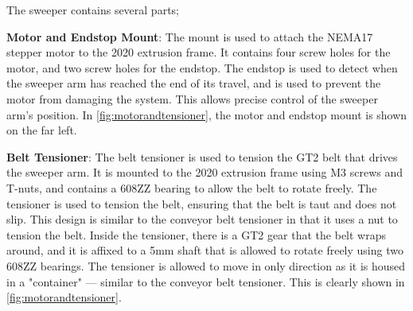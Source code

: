 The sweeper contains several parts;
\par
\textbf{Motor and Endstop Mount}: The mount is used to attach the NEMA17 stepper motor to the 2020 extrusion frame. It contains four screw holes for the motor, and two screw holes for the endstop. The endstop is used to detect when the sweeper arm has reached the end of its travel, and is used to prevent the motor from damaging the system. This allows precise control of the sweeper arm's position. In \autoref{fig:motorandtensioner}, the motor and endstop mount is shown on the far left.
\par
\textbf{Belt Tensioner}: The belt tensioner is used to tension the GT2 belt that drives the sweeper arm. It is mounted to the 2020 extrusion frame using M3 screws and T-nuts, and contains a 608ZZ bearing to allow the belt to rotate freely. The tensioner is used to tension the belt, ensuring that the belt is taut and does not slip. This design is similar to the conveyor belt tensioner in that it uses a nut to tension the belt. Inside the tensioner, there is a GT2 gear that the belt wraps around, and it is affixed to a 5mm shaft that is allowed to rotate freely using two 608ZZ bearings. The tensioner is allowed to move in only direction as it is housed in a "container" --- similar to the conveyor belt tensioner. This is clearly shown in \autoref{fig:motorandtensioner}.

